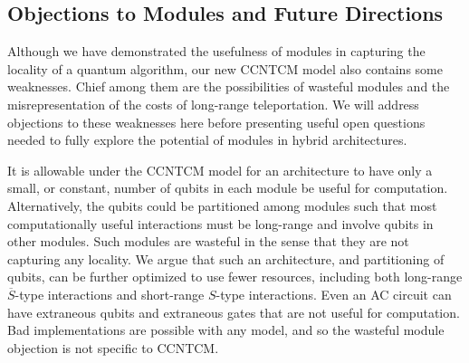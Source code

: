 

\subsection{Objections to Modules and Future Directions}
\label{subsec:module-future}

Although we have demonstrated the usefulness of modules in capturing
the locality of a quantum algorithm, our new \textsf{CCNTCM} model also
contains some weaknesses. Chief among them are the possibilities of
wasteful modules
and the misrepresentation of the costs of long-range teleportation. We will
address objections to these weaknesses here before presenting useful
open questions needed to fully explore the potential of modules in
hybrid architectures.

It is allowable under the \textsf{CCNTCM} model for an architecture
to have only a small,
or constant, number of qubits in each module be useful for computation.
Alternatively, the qubits could be partitioned among modules such that most
computationally useful interactions must be long-range and involve
qubits in other modules.
Such modules are wasteful in the sense that they are not capturing any
locality.
We argue that such an architecture, and partitioning of qubits, can be
further optimized to use fewer resources, including both long-range
$\overline{S}$-type interactions and short-range $S$-type interactions.
Even an \textsf{AC} circuit can have extraneous
qubits and extraneous gates that are not useful for computation.
Bad implementations are possible with any model, and so the wasteful module
objection is not specific to \textsf{CCNTCM}.

